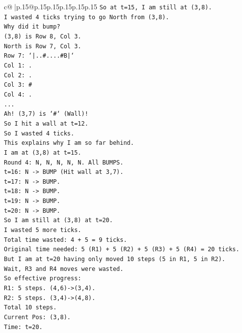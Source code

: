 \documentclass{article}
\begin{document}
{\begin{supertabular}{c@{$\;$}|p{.15\linewidth}@{}p{.15\linewidth}p{.15\linewidth}p{.15\linewidth}p{.15\linewidth}p{.15\linewidth}}
{{{\texttt{So at t=15, I am still at (3,8).} \\
\texttt{I wasted 4 ticks trying to go North from (3,8).} \\
\texttt{Why did it bump?} \\
\texttt{(3,8) is Row 8, Col 3.} \\
\texttt{North is Row 7, Col 3.} \\
\texttt{Row 7: `|..\#....\#B|`} \\
\texttt{Col 1: .} \\
\texttt{Col 2: .} \\
\texttt{Col 3: \#} \\
\texttt{Col 4: .} \\
\texttt{...} \\
\texttt{Ah! (3,7) is `\#` (Wall)!} \\
\texttt{So I hit a wall at t=12.} \\
\texttt{So I wasted 4 ticks.} \\
\texttt{This explains why I am so far behind.} \\
\texttt{I am at (3,8) at t=15.} \\
\texttt{Round 4: N, N, N, N, N. All BUMPS.} \\
\texttt{t=16: N {-}> BUMP (Hit wall at 3,7).} \\
\texttt{t=17: N {-}> BUMP.} \\
\texttt{t=18: N {-}> BUMP.} \\
\texttt{t=19: N {-}> BUMP.} \\
\texttt{t=20: N {-}> BUMP.} \\
\texttt{So I am still at (3,8) at t=20.} \\
\texttt{I wasted 5 more ticks.} \\
\texttt{Total time wasted: 4 + 5 = 9 ticks.} \\
\texttt{Original time needed: 5 (R1) + 5 (R2) + 5 (R3) + 5 (R4) = 20 ticks.} \\
\texttt{But I am at t=20 having only moved 10 steps (5 in R1, 5 in R2).} \\
\texttt{Wait, R3 and R4 moves were wasted.} \\
\texttt{So effective progress:} \\
\texttt{R1: 5 steps. (4,6){-}>(3,4).} \\
\texttt{R2: 5 steps. (3,4){-}>(4,8).} \\
\texttt{Total 10 steps.} \\
\texttt{Current Pos: (3,8).} \\
\texttt{Time: t=20.} \\
}}}
\end{supertabular}}
\end{document}
